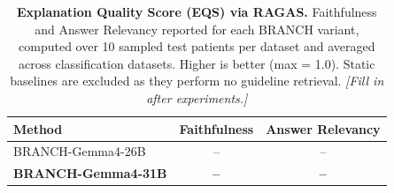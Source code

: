 \begin{table}[ht]
\centering
\caption{\textbf{Explanation Quality Score (EQS) via RAGAS.} Faithfulness and Answer Relevancy reported for each BRANCH variant, computed over 10 sampled test patients per dataset and averaged across classification datasets. Higher is better (max = 1.0). Static baselines are excluded as they perform no guideline retrieval. \textit{[Fill in after experiments.]}}
\label{tab:eqs}
\renewcommand{\arraystretch}{1.2}
\begin{tabular}{lcc}
\toprule
\textbf{Method} & \textbf{Faithfulness} & \textbf{Answer Relevancy} \\
\midrule
BRANCH-Gemma4-26B & -- & -- \\
\textbf{BRANCH-Gemma4-31B} & \textbf{--} & \textbf{--} \\
\bottomrule
\end{tabular}
\end{table}
